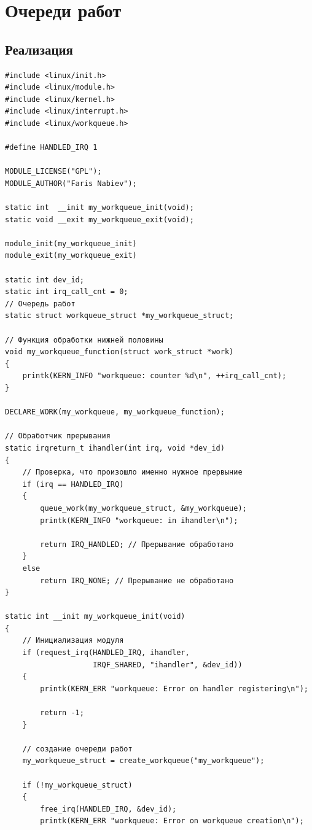 \chapter{Очереди работ}

\section{Реализация}

\begin{lstlisting}[caption={}]
#include <linux/init.h>
#include <linux/module.h>
#include <linux/kernel.h>
#include <linux/interrupt.h>
#include <linux/workqueue.h>

#define HANDLED_IRQ 1

MODULE_LICENSE("GPL");
MODULE_AUTHOR("Faris Nabiev");

static int  __init my_workqueue_init(void);
static void __exit my_workqueue_exit(void);

module_init(my_workqueue_init)
module_exit(my_workqueue_exit)

static int dev_id;
static int irq_call_cnt = 0;
// Очередь работ
static struct workqueue_struct *my_workqueue_struct;

// Функция обработки нижней половины
void my_workqueue_function(struct work_struct *work)
{
    printk(KERN_INFO "workqueue: counter %d\n", ++irq_call_cnt);
}

DECLARE_WORK(my_workqueue, my_workqueue_function);

// Обработчик прерывания
static irqreturn_t ihandler(int irq, void *dev_id)
{
    // Проверка, что произошло именно нужное прервыние
    if (irq == HANDLED_IRQ)
    {
        queue_work(my_workqueue_struct, &my_workqueue);
        printk(KERN_INFO "workqueue: in ihandler\n");

        return IRQ_HANDLED; // Прерывание обработано
    }
    else
        return IRQ_NONE; // Прерывание не обработано
}

static int __init my_workqueue_init(void)
{
    // Инициализация модуля
    if (request_irq(HANDLED_IRQ, ihandler,
                    IRQF_SHARED, "ihandler", &dev_id))
    {
        printk(KERN_ERR "workqueue: Error on handler registering\n");

        return -1;
    }

    // создание очереди работ
    my_workqueue_struct = create_workqueue("my_workqueue");

    if (!my_workqueue_struct)
    {
        free_irq(HANDLED_IRQ, &dev_id);
        printk(KERN_ERR "workqueue: Error on workqueue creation\n");


\end{lstlisting}
